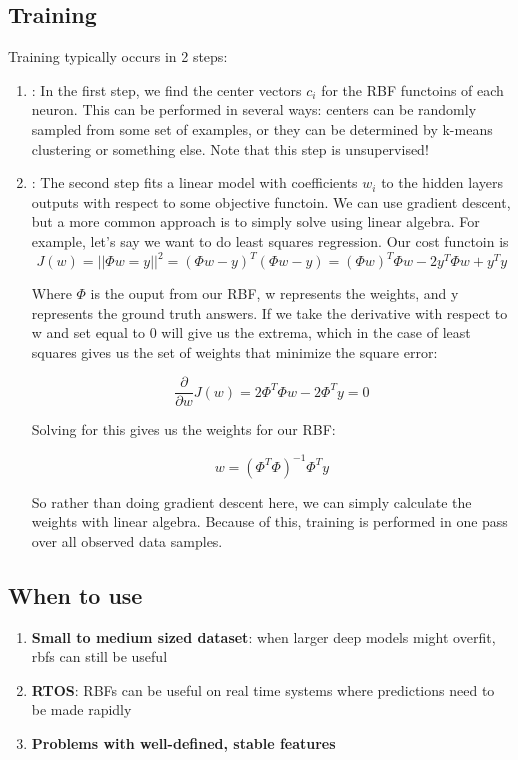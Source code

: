 \documentclass[12pt]{article}
\begin{document}
\subsection{Training}
Training typically occurs in 2 steps:
\begin{enumerate}
\item: In the first step, we find the center vectors \(c_i\) for the RBF functoins of each neuron. This can be performed in several ways: centers can be randomly sampled from some set of examples, or they can be determined by k-means clustering or something else. Note that this step is unsupervised!
\item: The second step fits a linear model with coefficients \(w_i\) to the hidden layers outputs with respect to some objective functoin. We can use gradient descent, but a more common approach is to simply solve using linear algebra. For example, let's say we want to do least squares regression. Our cost functoin is 
\[J(w) = ||\Phi w = y ||^2 = (\Phi w - y)^T(\Phi w - y) = (\Phi w)^T\Phi w - 2y^T\Phi w + y^Ty\]

Where \(\Phi\) is the ouput from our RBF, w represents the weights, and y represents the ground truth answers. If we take the derivative with respect to w and set equal to 0 will give us the extrema, which in the case of least squares gives us the set of weights that minimize the square error:

\[\frac{\partial}{\partial w}J(w) = 2\Phi^T\Phi w - 2\Phi^Ty = 0\]

Solving for this gives us the weights for our RBF:

\[w = (\Phi^T\Phi)^{-1}\Phi^Ty\]

So rather than doing gradient descent here, we can simply calculate the weights with linear algebra. Because of this, training is performed in one pass over all observed data samples.

\end{enumerate}

\subsection{When to use}
\begin{enumerate}
\item \textbf{Small to medium sized dataset}: when larger deep models might overfit, rbfs can still be useful
\item \textbf{RTOS}: RBFs can be useful on real time systems where predictions need to be made rapidly
\item \textbf{Problems with well-defined, stable features} 
\end{enumerate}
\end{document}
